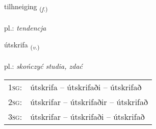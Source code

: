 \documentclass[frontgrid, backgrid]{flacards}\usepackage[]{graphicx}\usepackage[]{xcolor}
\begin{document}
\renewcommand{\flhead}{\vskip5pt \fboxsep=0pt {\small\bfseries\footnotesize Nafnorð | rzeczownik}}
\renewcommand{\fcfoot}{\vskip5pt \fboxsep=0pt \hspace{2pt}{\small\bfseries\footnotesize 3K}}

\renewcommand{\blhead}{\vskip5pt {\small\bfseries\footnotesize Nafnorð | rzeczownik }}
\renewcommand{\bcfoot}{\vskip5pt \hspace{2pt}{\small\bfseries\footnotesize 3K}}


{tilhneiging \small{\textsubscript{(\textit{f.})}} \\[1ex] %
 \\
pl.: \emph{tendencja} \\  [2ex]
\renewcommand*{\arraystretch}{0.8}
}

\renewcommand{\flhead}{\vskip5pt \fboxsep=0pt {\small\bfseries\footnotesize Sagnorð | czasownik}}
\renewcommand{\fcfoot}{\vskip5pt \fboxsep=0pt \hspace{2pt}{\small\bfseries\footnotesize 3K}}

\renewcommand{\blhead}{\vskip5pt {\small\bfseries\footnotesize Sagnorð | czasownik }}
\renewcommand{\bcfoot}{\vskip5pt \hspace{2pt}{\small\bfseries\footnotesize 3K}}


{útskrifa \small{\textsubscript{(\textit{v.})}} \\[1ex] %
\textphonetic{[utskrɪva]} \\
pl.: \emph{skończyć studia, zdać} \\  [2ex]
\renewcommand*{\arraystretch}{0.8}
\begin{tabular}{p{1cm}l}
\textsc{1sg}: & útskrifa -- útskrifaði -- útskrifað \\ 
\textsc{2sg}: & útskrifar -- útskrifaðir -- útskrifað \\ 
\textsc{3sg}: & útskrifar -- útskrifaði -- útskrifað \\ 
\end{tabular}
}
\end{document}
